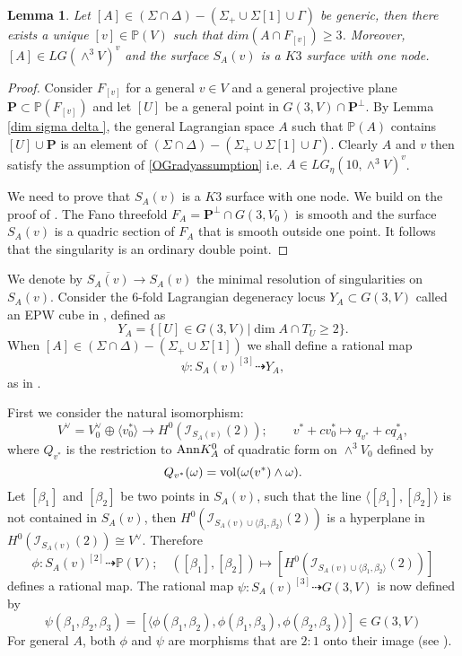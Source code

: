 \documentclass[a4paper,11pt]{amsart}
\newtheorem{lem}[thm]{Lemma}
\theoremstyle{definition}
\numberwithin{equation}{section}
\numberwithin{equation}{section} \theoremstyle{definition}
\begin{document}
 
\begin{lem}\label{K3node} Let $[A] \in (\Sigma\cap \Delta)-(\Sigma_+\cup \Sigma[1]\cup \Gamma)$ be generic, then there exists a unique $[v]\in {{\mathbb{P}}}(V)$ such that $dim (A\cap F_{[v]})\geq 3$. Moreover, $[A]\in LG(\wedge^3 V)^{v}$ and the surface $S_A(v)$ is a $K3$ surface with one node.
 \end{lem}
 \begin{proof}
 Consider $F_{[v]}$ for a general  $v\in V$ and a general projective plane $\mathbf{P}\subset {{\mathbb{P}}}(F_{[v]})$ and let $[U]$ be a general point in $G(3,V)\cap \mathbf{P}^{\perp}$.
  By Lemma \ref{dim sigma delta }, the general Lagrangian space $A$ such that ${{\mathbb{P}}}(A)$ contains $[U]\cup \mathbf{P}$ is an element of  $(\Sigma\cap \Delta)-(\Sigma_+\cup \Sigma[1] \cup \Gamma)$. Clearly $A$ and $v$ then satisfy the assumption of \ref{OGradyassumption} i.e. $A\in LG_\eta(10,\wedge^3 V)^{v}$.
 
 We need to prove that $S_A(v)$ is a $K3$ surface with one node. We build on the proof of \cite[Proposition~4.6]{Ogrady-michigan}. The Fano threefold $F_A=\mathbf{P}^{\perp} \cap G(3,V_0)
 $ is smooth and the surface  $S_A(v)$ is a quadric section of $F_A$ that is smooth outside one point. It follows that the singularity is an ordinary double point. 
 \end{proof}

We denote by  $\overline{S_A(v)}\to S_A(v)$ the minimal resolution of singularities on $S_A(v)$.
  Consider the $6$-fold Lagrangian degeneracy locus $Y_A\subset G(3,V)$ called an EPW cube in \cite {EPWcubes}, defined as 
  \[
  Y_A=\{[U]\in G(3,V)|\dim A\cap T_U\geq 2\}.
  \]
When $[A]\in  (\Sigma\cap \Delta)-(\Sigma_+\cup \Sigma[1])$ we shall define a rational map   $$\psi\colon S_A(v)^{[3]}\dasharrow Y_A,$$
as in \cite[\S 4]{EPWcubes}.    

First we consider the natural isomorphism:
\[
V^{\vee}=V_0^{\vee}\oplus \langle v_0^*\rangle \to H^0(\mathcal{I}_{S_A(v)}(2));\qquad  v^*+cv_0^*\mapsto q_{v^*}+cq^*_A,
\]
where $Q_{v^*}$ is the restriction to ${\rm Ann} K_A^0$ of quadratic form on $\wedge^3 V_0$ defined by
\[
Q_{v^*}(\omega)={\rm vol}(\omega(v^*)\wedge \omega).
\]
Let $[\beta_1]$ and $[\beta_2]$ be two points in $S_A(v)$, such that the line $\langle [\beta_1],[\beta_2]\rangle$ is not contained in $S_A(v)$, then 
$H^0(\mathcal{I}_{S_A(v)\cup\langle \beta_1,\beta_2\rangle }(2))$ is a hyperplane in $H^0(\mathcal{I}_{S_A(v)}(2))\cong V^{\vee}$.  Therefore 
\[
\phi\colon S_A(v)^{[2]}\dasharrow {{\mathbb{P}}}(V);\quad ([\beta_1],[\beta_2])\mapsto [H^0(\mathcal{I}_{S_A(v)\cup\langle \beta_1,\beta_2\rangle }(2))]
\]
defines a rational map.  The rational map $\psi\colon S_A(v)^{[3]}\dasharrow G(3,V)$ is now defined by 
\[
\psi(\beta_1,\beta_2,\beta_3) 
=[\langle \phi(\beta_1,\beta_2),\phi(\beta_1,\beta_3),\phi(\beta_2,\beta_3) \rangle]\in G(3,V)
\]
For general $A$, both $\phi$ and $\psi $ are morphisms that are $2:1$ onto their image (see \cite[Proposition 4.1]{EPWcubes} ).
\end{document}
